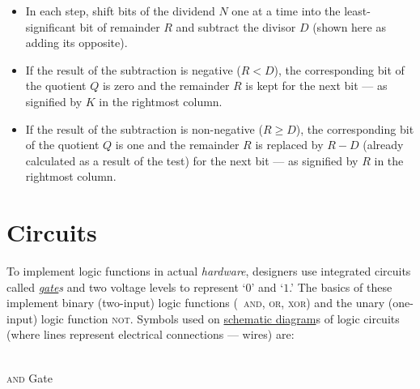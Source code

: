 \documentclass[11pt]{article}%
\begin{document}
\begin{multicols}{2}
\begin{itemize}
\item In each step, shift bits of the dividend $N$ one at a time into the least-significant bit of remainder $R$ and subtract the divisor $D$ (shown here as adding its opposite).
\item If the result of the subtraction is negative ($R < D$), the corresponding bit of the quotient $Q$ is zero and the remainder $R$ is kept for the next bit --- as signified by $K$ in the rightmost column.
\item If the result of the subtraction is non-negative ($R \ge D$), the corresponding bit of the quotient $Q$ is one and the remainder $R$ is replaced by $R - D$ (already calculated as a result of the test) for the next bit --- as signified by $R$ in the rightmost column.
\end{itemize}

\section{Circuits}
\label{Circuits}

To implement logic functions in actual \textit{hardware}, designers use integrated circuits called \textit{\href{https://en.wikipedia.org/wiki/Logic_gate}{gate}s} \parencite{wiki:logic-gate} and two voltage levels to represent `$0$' and `$1$.' The basics of these implement binary (two-input) logic functions (\eg\ \textsc{and}, \textsc{or}, \textsc{xor}) and the unary (one-input) logic function \textsc{not}. Symbols used on \href{https://en.wikipedia.org/wiki/Schematic#Electrical_and_electronic_industry}{schematic diagram}s of logic circuits (where lines represent electrical connections --- wires) are:


\begin{center}
 \\\textsc{and} Gate
\end{center}


\end{multicols}
\end{document}
